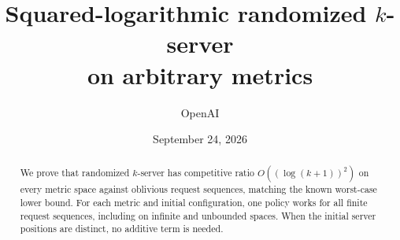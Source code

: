 
\title{Squared-logarithmic randomized \(k\)-server\\
on arbitrary metrics}
\author{OpenAI}
\date{September 24, 2026}

\maketitle
\begin{abstract}
We prove that randomized \(k\)-server has competitive ratio
\(O((\log(k+1))^2)\) on every metric space against oblivious request
sequences, matching the known worst-case lower bound. For each metric
and initial configuration, one policy works for all finite request
sequences, including on infinite and unbounded spaces. When the initial
server positions are distinct, no additive term is needed.
\end{abstract}
\tableofcontents












